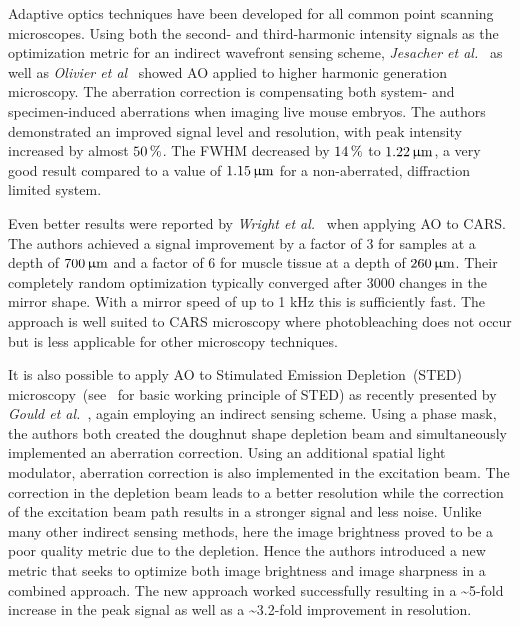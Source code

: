 Adaptive optics techniques have been developed for all common point scanning microscopes. Using both the second- and third-harmonic intensity signals as the optimization metric for an indirect wavefront sensing scheme, \emph{Jesacher et al.}~\cite{scan_HG_dynamic} as well as \emph{Olivier et al}~\cite{scan_HG_embryos} showed AO applied to higher harmonic generation microscopy. The aberration correction is compensating both system- and specimen-induced aberrations when imaging live mouse embryos. The authors demonstrated an improved signal level and resolution, with peak intensity increased by almost $\unit[50]{\%}$. The FWHM decreased by $\unit[14]{\%}$ to  $\unit[1.22]{\upmu m}$, a very good result compared to a value of $\unit[1.15]{\upmu m}$ for a non-aberrated, diffraction limited system.

Even better results were reported by \emph{Wright et al.}~\cite{scan_CARS} when applying AO to CARS. The authors achieved a signal improvement by a factor of 3 for samples at a depth of $\unit[700]{\upmu m}$ and a factor of 6 for muscle tissue at a depth of $\unit[260]{\upmu m}$. Their completely random optimization typically converged after 3000 changes in the mirror shape. With a mirror speed of up to 1 kHz this is sufficiently fast. The approach is well suited to CARS microscopy where photobleaching does not occur but is less applicable for other microscopy techniques. 

It is also possible to apply AO to Stimulated Emission Depletion~(STED) microscopy~(see~\cite{scan_STED_principle} for basic working principle of STED) as recently presented by \emph{Gould et al.}~\cite{scan_STED}, again employing an indirect sensing scheme. Using a phase mask, the authors both created the doughnut shape depletion beam and simultaneously implemented an aberration correction. Using an additional spatial light modulator, aberration correction is also implemented in the excitation beam. The correction in the depletion beam leads to a better resolution while the correction of the excitation beam path results in a stronger signal and less noise. Unlike many other indirect sensing methods, here the image brightness proved to be a poor quality metric due to the depletion. Hence the authors introduced a new metric that seeks to optimize both image brightness and image sharpness in a combined approach. The new approach worked successfully resulting in a \textasciitilde5-fold increase in the peak signal as well as a \textasciitilde3.2-fold improvement in resolution.

